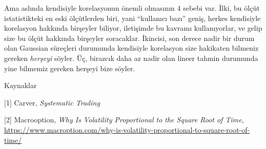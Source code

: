 \documentclass[12pt,fleqn]{article}\usepackage{../../common}
\begin{document}
Ama aslında kendisiyle korelasyonun önemli olmasının 4 sebebi var. İlki, bu
ölçüt istatistikteki en eski ölçütlerden biri, yani ``kullanıcı bazı'' geniş,
herkes kendisiyle korelasyon hakkında birşeyler biliyor, iletişimde bu kavramı
kullanıyorlar, ve gelip size bu ölçüt hakkında birşeyler soracaklar. İkincisi,
son derece nadir bir durum olan Gaussian süreçleri durumunda kendisiyle
korelasyon size hakikaten bilmeniz gereken {\em herşeyi} söyler. Üç, birazcık
daha az nadir olan lineer tahmin durumunda yine bilmemiz gereken herşeyi bize
söyler. 

Kaynaklar

[1] Carver, {\em Systematic Trading}

[2] Macrooption, {\em Why Is Volatility Proportional to the Square Root of  Time},
    \url{https://www.macroption.com/why-is-volatility-proportional-to-square-root-of-time/}
\end{document}
